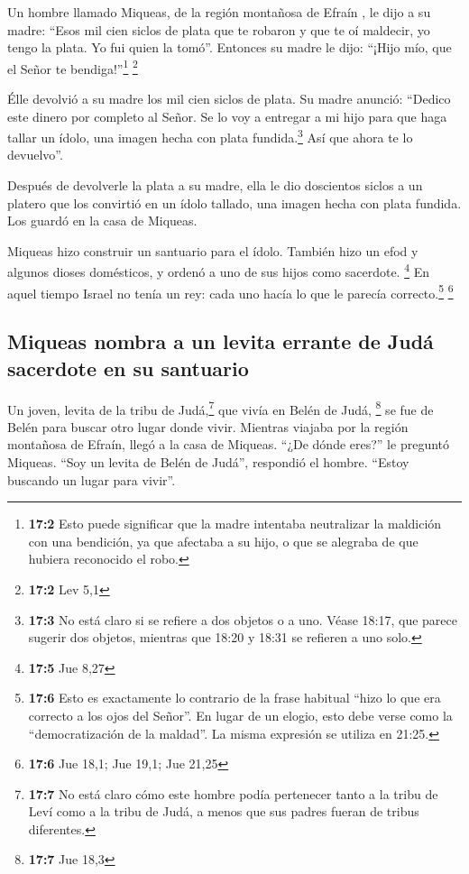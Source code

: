  Un hombre llamado Miqueas, de la región montañosa de
Efraín  , le dijo a su madre: ``Esos mil cien siclos de
plata que te robaron y que te oí maldecir, yo tengo la plata. Yo fui
quien la tomó''. Entonces su madre le dijo: ``¡Hijo mío, que el Señor te
bendiga!''\footnote{\textbf{17:2} Esto puede significar que la madre
  intentaba neutralizar la maldición con una bendición, ya que afectaba
  a su hijo, o que se alegraba de que hubiera reconocido el robo.}
\footnote{\textbf{17:2} Lev 5,1}

 Élle devolvió a su madre los mil cien siclos de plata. Su
madre anunció: ``Dedico este dinero por completo al Señor. Se lo voy a
entregar a mi hijo para que haga tallar un ídolo, una imagen hecha con
plata fundida.\footnote{\textbf{17:3} No está claro si se refiere a dos
  objetos o a uno. Véase 18:17, que parece sugerir dos objetos, mientras
  que 18:20 y 18:31 se refieren a uno solo.} Así que ahora te lo
devuelvo''.

 Después de devolverle la plata a su madre, ella le dio
doscientos siclos a un platero que los convirtió en un ídolo tallado,
una imagen hecha con plata fundida. Los guardó en la casa de Miqueas.

 Miqueas hizo construir un santuario para el ídolo.
También hizo un efod y algunos dioses domésticos, y ordenó a uno de sus
hijos como sacerdote. \footnote{\textbf{17:5} Jue 8,27} 
En aquel tiempo Israel no tenía un rey: cada uno hacía lo que le parecía
correcto.\footnote{\textbf{17:6} Esto es exactamente lo contrario de la
  frase habitual ``hizo lo que era correcto a los ojos del Señor''. En
  lugar de un elogio, esto debe verse como la ``democratización de la
  maldad''. La misma expresión se utiliza en 21:25.} \footnote{\textbf{17:6}
  Jue 18,1; Jue 19,1; Jue 21,25}

\hypertarget{miqueas-nombra-a-un-levita-errante-de-juduxe1-sacerdote-en-su-santuario}{%
\subsection{Miqueas nombra a un levita errante de Judá sacerdote en su
santuario}\label{miqueas-nombra-a-un-levita-errante-de-juduxe1-sacerdote-en-su-santuario}}

 Un joven, levita de la tribu de Judá,\footnote{\textbf{17:7}
  No está claro cómo este hombre podía pertenecer tanto a la tribu de
  Leví como a la tribu de Judá, a menos que sus padres fueran de tribus
  diferentes.} que vivía en Belén de Judá, \footnote{\textbf{17:7} Jue
  18,3}  se fue de Belén para buscar otro lugar donde
vivir. Mientras viajaba por la región montañosa de Efraín, llegó a la
casa de Miqueas.  ``¿De dónde eres?'' le preguntó Miqueas.
``Soy un levita de Belén de Judá'', respondió el hombre. ``Estoy
buscando un lugar para vivir''.

